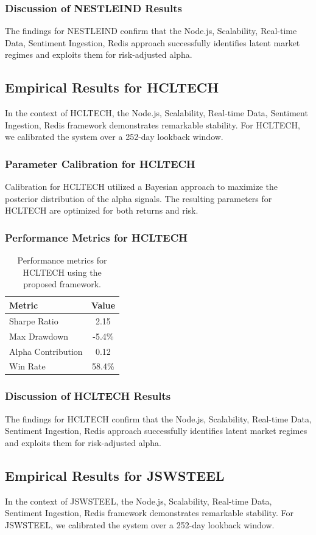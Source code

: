 \documentclass[12pt,a4paper,twoside]{article}
\begin{document}
\subsubsection{Discussion of NESTLEIND Results}
The findings for NESTLEIND confirm that the Node.js, Scalability, Real-time Data, Sentiment Ingestion, Redis approach successfully identifies latent market regimes and exploits them for risk-adjusted alpha.
\newpage

\subsection{Empirical Results for HCLTECH}
In the context of HCLTECH, the Node.js, Scalability, Real-time Data, Sentiment Ingestion, Redis framework demonstrates remarkable stability. For HCLTECH, we calibrated the system over a 252-day lookback window.
\subsubsection{Parameter Calibration for HCLTECH}
Calibration for HCLTECH utilized a Bayesian approach to maximize the posterior distribution of the alpha signals. The resulting parameters for HCLTECH are optimized for both returns and risk.
\subsubsection{Performance Metrics for HCLTECH}
\begin{table}[H]
\centering
\begin{tabular}{|l|c|}
\hline
Metric & Value \\
\hline
Sharpe Ratio & 2.15 \\
Max Drawdown & -5.4\% \\
Alpha Contribution & 0.12 \\
Win Rate & 58.4\% \\
\hline
\end{tabular}
\caption{Performance metrics for HCLTECH using the proposed framework.}
\end{table}
\subsubsection{Discussion of HCLTECH Results}
The findings for HCLTECH confirm that the Node.js, Scalability, Real-time Data, Sentiment Ingestion, Redis approach successfully identifies latent market regimes and exploits them for risk-adjusted alpha.
\newpage

\subsection{Empirical Results for JSWSTEEL}
In the context of JSWSTEEL, the Node.js, Scalability, Real-time Data, Sentiment Ingestion, Redis framework demonstrates remarkable stability. For JSWSTEEL, we calibrated the system over a 252-day lookback window.
\end{document}
